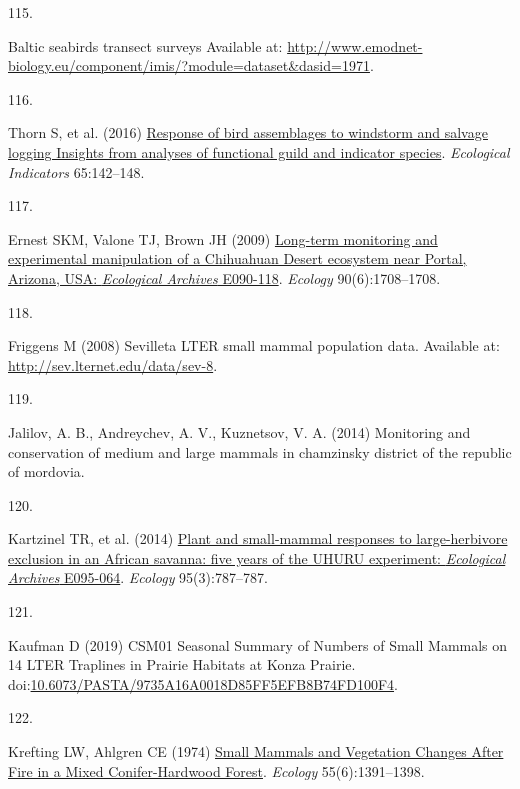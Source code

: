 \documentclass{article}
\newlength{\cslhangindent}
\newlength{\csllabelwidth}
\newlength{\cslentryspacingunit} %
\newenvironment{CSLReferences}[2] %
 {%
  \setlength{\parindent}{0pt}
  \ifodd #1
  \let\oldpar\par
  \def\par{\hangindent=\cslhangindent\oldpar}
  \fi
  \setlength{\parskip}{#2\cslentryspacingunit}
 }%
 {}
\newcommand{\CSLLeftMargin}[1]{\parbox[t]{\csllabelwidth}{#1}}
\newcommand{\CSLRightInline}[1]{\parbox[t]{\linewidth - \csllabelwidth}{#1}\break}
\begin{document}
\begin{CSLReferences}{0}{0}
\leavevmode{}%
\CSLLeftMargin{115. }%
\CSLRightInline{Baltic seabirds transect surveys Available at:
\url{http://www.emodnet-biology.eu/component/imis/?module=dataset\&dasid=1971}.}

\leavevmode{}%
\CSLLeftMargin{116. }%
\CSLRightInline{Thorn S, et al. (2016)
\href{https://doi.org/10.1016/j.ecolind.2015.06.033}{Response of bird
assemblages to windstorm and salvage logging {\textemdash} Insights from
analyses of functional guild and indicator species}. \emph{Ecological
Indicators} 65:142--148.}

\leavevmode{}%
\CSLLeftMargin{117. }%
\CSLRightInline{Ernest SKM, Valone TJ, Brown JH (2009)
\href{https://doi.org/10.1890/08-1222.1}{Long-term monitoring and
experimental manipulation of a Chihuahuan Desert ecosystem near Portal,
Arizona, USA: {\emph{Ecological Archives}} E090-118}. \emph{Ecology}
90(6):1708--1708.}

\leavevmode{}%
\CSLLeftMargin{118. }%
\CSLRightInline{Friggens M (2008) Sevilleta LTER small mammal population
data. Available at: \url{http://sev.lternet.edu/data/sev-8}.}

\leavevmode{}%
\CSLLeftMargin{119. }%
\CSLRightInline{Jalilov, A. B., Andreychev, A. V., Kuznetsov, V. A.
(2014) Monitoring and conservation of medium and large mammals in
chamzinsky district of the republic of mordovia.}

\leavevmode{}%
\CSLLeftMargin{120. }%
\CSLRightInline{Kartzinel TR, et al. (2014)
\href{https://doi.org/10.1890/13-1023R.1}{Plant and small-mammal
responses to large-herbivore exclusion in an African savanna: five years
of the UHURU experiment: {\emph{Ecological Archives}} E095-064}.
\emph{Ecology} 95(3):787--787.}

\leavevmode{}%
\CSLLeftMargin{121. }%
\CSLRightInline{Kaufman D (2019) CSM01 Seasonal Summary of Numbers of
Small Mammals on 14 LTER Traplines in Prairie Habitats at Konza Prairie.
doi:\href{https://doi.org/10.6073/PASTA/9735A16A0018D85FF5EFB8B74FD100F4}{10.6073/PASTA/9735A16A0018D85FF5EFB8B74FD100F4}.}

\leavevmode{}%
\CSLLeftMargin{122. }%
\CSLRightInline{Krefting LW, Ahlgren CE (1974)
\href{https://doi.org/10.2307/1935467}{Small Mammals and Vegetation
Changes After Fire in a Mixed Conifer-Hardwood Forest}. \emph{Ecology}
55(6):1391--1398.}


\end{CSLReferences}
\end{document}

